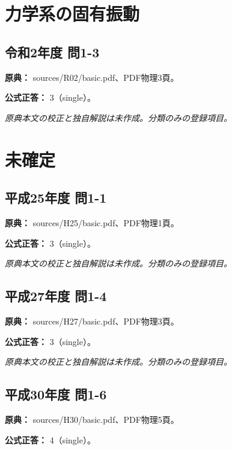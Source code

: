 \section{力学系の固有振動}

\subsection{令和2年度 問1-3}
\label{q:r02-reg-basic-1-3}

\noindent\textbf{原典：} sources/R02/basic.pdf、PDF物理3頁。

\textbf{公式正答：} 3（single）。

\par\textit{原典本文の校正と独自解説は未作成。分類のみの登録項目。}

\section{未確定}

\subsection{平成25年度 問1-1}
\label{q:h25-reg-basic-1-1}

\noindent\textbf{原典：} sources/H25/basic.pdf、PDF物理1頁。

\textbf{公式正答：} 3（single）。

\par\textit{原典本文の校正と独自解説は未作成。分類のみの登録項目。}

\subsection{平成27年度 問1-4}
\label{q:h27-reg-basic-1-4}

\noindent\textbf{原典：} sources/H27/basic.pdf、PDF物理3頁。

\textbf{公式正答：} 3（single）。

\par\textit{原典本文の校正と独自解説は未作成。分類のみの登録項目。}

\subsection{平成30年度 問1-6}
\label{q:h30-reg-basic-1-6}

\noindent\textbf{原典：} sources/H30/basic.pdf、PDF物理5頁。

\textbf{公式正答：} 4（single）。

